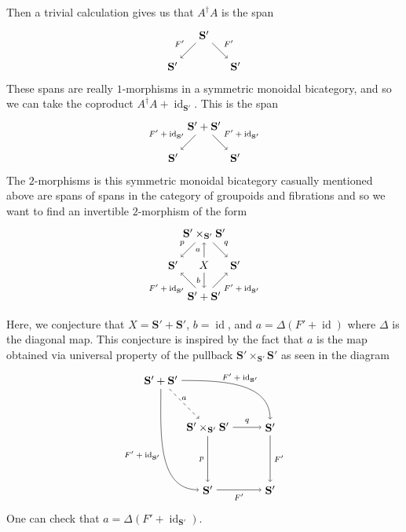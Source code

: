 \documentclass[11pt]{amsart}
\newcommand{\cat}[1]{\mathbf{#1}}
\DeclareMathOperator{\id}{id}
\theoremstyle{remark}
\theoremstyle{definition}
\begin{document}
Then a trivial calculation gives us that $A^\dagger A$ is the span
\[
	\begin{tikzpicture}
		\node (lleg) at (-1,0) {$\cat{S}'$};
		\node (apex) at (0,1) {$\cat{S}'$};
		\node (rleg) at (1,0) {$\cat{S}'$};
		\draw [->] (apex) to node[above left] {\scriptsize $F'$} (lleg);
		\draw [->] (apex) to node[above right] {\scriptsize $F'$} (rleg);
	\end{tikzpicture}
\]
These spans are really $1$-morphisms in a symmetric monoidal bicategory, and so we can take the coproduct $A^\dagger A + \id_{\cat{S}'}$. This is the span
\[
	\begin{tikzpicture}
		\node (lleg) at (-1,0) {$\cat{S}'$};
		\node (apex) at (0,1) {$\cat{S}'+\cat{S}'$};
		\node (rleg) at (1,0) {$\cat{S}'$};
		\draw [->] (apex) to node[above left] {\scriptsize $F'+\id_{\cat{S}'}$} (lleg);
		\draw [->] (apex) to node[above right] {\scriptsize $F'+\id_{\cat{S}'}$} (rleg);
	\end{tikzpicture}
\]
The $2$-morphisms is this symmetric monoidal bicategory casually mentioned above are spans of spans in the category of groupoids and fibrations and so we want to find an invertible $2$-morphism of the form
\[
	\begin{tikzpicture}
		\node (lleg) at (-1,0) {$\cat{S}'$};
		\node (uapex) at (0,1) {$\cat{S}'\times_{\cat{S}'}\cat{S}'$};
		\node (lapex) at (0,-1) {$\cat{S}'+\cat{S}'$};
		\node (rleg) at (1,0) {$\cat{S}'$};
		\node (mid) at (0,0) {$X$};
		\draw [->] (uapex) to node[above left] {\scriptsize $p$} (lleg);
		\draw [->] (uapex) to node[above right] {\scriptsize $q$} (rleg);
		\draw [->] (lapex) to node[below left] {\scriptsize $F'+\id_{\cat{S}'}$} (lleg);
		\draw [->] (lapex) to node[below right] {\scriptsize $F'+\id_{\cat{S}'}$} (rleg);
		\draw [<-] (uapex) to node[left] {\scriptsize $a$} (mid);
		\draw [<-] (lapex) to node[left] {\scriptsize $b$} (mid);
	\end{tikzpicture}
\]

Here, we conjecture that $X = \cat{S}' + \cat{S}'$, $b = \id$, and $a = \Delta \left( F' + \id \right)$ where $\Delta$ is the diagonal map.  This conjecture is inspired by the fact that $a$ is the map obtained via universal property of the pullback $\cat{S}' \times_{\cat{S}'} \cat{S}'$ as seen in the diagram
\[
\begin{tikzpicture}
	\node (1) at (-1.5,2.5) {$\cat{S}' + \cat{S}'$};
	\node (2) at (0,1) {$\cat{S}' \times_{\cat{S}'} \cat{S}'$};
	\node (3) at (2,1) {$\cat{S}'$};
	\node (4) at (0,-1) {$\cat{S}'$};
	\node (5) at (2,-1) {$\cat{S}'$};
	\draw [dashed,->] (1) to[] node[above]{\scriptsize $a$} (2);
	\draw [->] (1) to[out=0,in=90] node[above]{\scriptsize $F'+\id_{\cat{S}'}$} (3);
	\draw [->] (1) to[out=-90,in=180] node[left]{\scriptsize $F'+\id_{\cat{S}'}$} (4);
	\draw [->] (2) to[] node[above]{\scriptsize $q$} (3);
	\draw [->] (2) to[] node[left]{\scriptsize $p$} (4);
	\draw [->] (3) to[] node[right]{\scriptsize $F'$} (5);
	\draw [->] (4) to[] node[below]{\scriptsize $F'$} (5);
\end{tikzpicture}
\]
One can check that $a = \Delta (F' + \id_{\cat{S}'})$.
\end{document}
